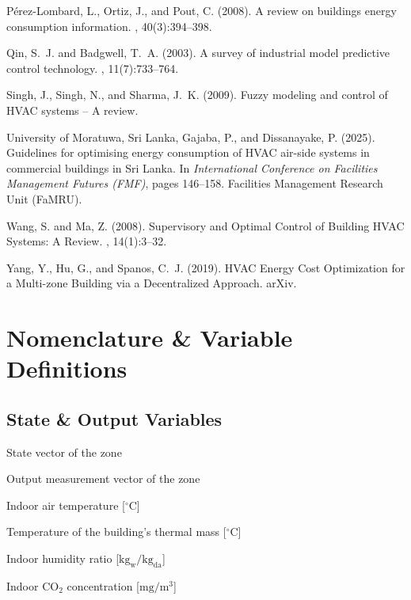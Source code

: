 \documentclass[12pt, a4paper]{article}
\begin{document}
\begin{thebibliography}{}
		Pérez-Lombard, L., Ortiz, J., and Pout, C. (2008).
		\newblock A review on buildings energy consumption information. 
		, 40(3):394--398.
		
		Qin, S.~J. and Badgwell, T.~A. (2003).
		\newblock A survey of industrial model predictive control technology. 
		, 11(7):733--764.
		
		Singh, J., Singh, N., and Sharma, J.~K. (2009).
		\newblock Fuzzy modeling and control of HVAC systems – A review. 
		
		University of Moratuwa, Sri Lanka, Gajaba, P., and Dissanayake, P. (2025).
		\newblock Guidelines for optimising energy consumption of HVAC air-side systems in commercial buildings in Sri Lanka. 
		\newblock In {\em International Conference on Facilities Management Futures (FMF)}, pages 146--158. Facilities Management Research Unit (FaMRU).
		
		Wang, S. and Ma, Z. (2008).
		\newblock Supervisory and Optimal Control of Building HVAC Systems: A Review. 
		, 14(1):3--32.
		
		Yang, Y., Hu, G., and Spanos, C.~J. (2019).
		\newblock HVAC Energy Cost Optimization for a Multi-zone Building via a Decentralized Approach. 
		\newblock arXiv.
		
	\end{thebibliography}
	\newpage
	
	\appendix
	\section{Nomenclature \& Variable Definitions}
	
	\subsection*{State \& Output Variables}
	\begin{description}[align=left, labelwidth=2.5cm, leftmargin=!]
		\item[$x$] State vector of the zone
		\item[$y$] Output measurement vector of the zone
		\item[$T_{\mathrm{in}}$] Indoor air temperature [$^\circ\mathrm{C}$]
		\item[$T_m$] Temperature of the building's thermal mass [$^\circ\mathrm{C}$]
		\item[$W_{\mathrm{in}}$] Indoor humidity ratio [$\mathrm{kg_w/kg_{da}}$]
		\item[$C_{\mathrm{in}}$] Indoor $\mathrm{CO}_2$ concentration [$\mathrm{mg/m^3}$]
	\end{description}
	
\end{document}
